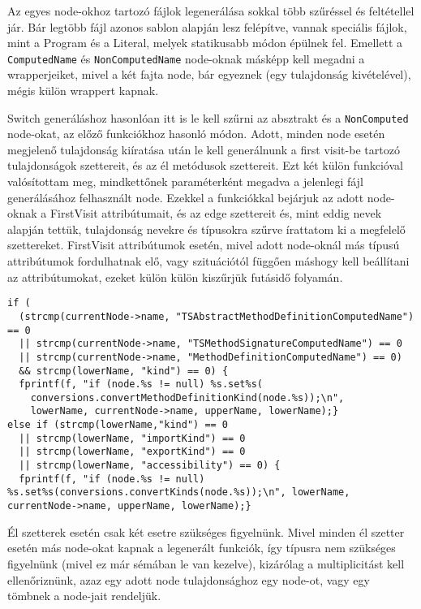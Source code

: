 Az egyes node-okhoz tartozó fájlok legenerálása sokkal több szűréssel és feltétellel jár. Bár legtöbb fájl azonos sablon alapján lesz felépítve, vannak speciális fájlok, mint a Program és a Literal, melyek statikusabb módon épülnek fel. Emellett a \texttt{ComputedName} és \texttt{NonComputedName} node-oknak másképp kell megadni a wrapperjeiket, mivel a két fajta node, bár egyeznek (egy tulajdonság kivételével), mégis külön wrappert kapnak.

Switch generáláshoz hasonlóan itt is le kell szűrni az absztrakt és a \texttt{NonComputed} node-okat, az előző funkciókhoz hasonló módon.
Adott, minden node esetén megjelenő tulajdonság kiíratása után le kell generálnunk a first visit-be tartozó tulajdonságok szettereit, és az él metódusok szettereit. Ezt két külön funkcióval valósítottam meg, mindkettőnek paraméterként megadva a jelenlegi fájl generálásához felhasznált node. 
Ezekkel a funkciókkal bejárjuk az adott node-oknak a FirstVisit attribútumait, és az edge szettereit és, mint eddig nevek alapján tettük, tulajdonság nevekre és típusokra szűrve írattatom ki a megfelelő szettereket.
FirstVisit attribútumok esetén, mivel adott node-oknál más típusú attribútumok fordulhatnak elő, vagy szituációtól függően máshogy kell beállítani az attribútumokat, ezeket külön külön kiszűrjük futásidő folyamán.

\begin{lstlisting}[caption={Attribútum szűrésről példa},label={lst:attributefilter}, style={CStyle},basicstyle=\fontsize{9}{11}\selectfont\ttfamily]
if (
  (strcmp(currentNode->name, "TSAbstractMethodDefinitionComputedName") == 0 
  || strcmp(currentNode->name, "TSMethodSignatureComputedName") == 0 
  || strcmp(currentNode->name, "MethodDefinitionComputedName") == 0) 
  && strcmp(lowerName, "kind") == 0) {
  fprintf(f, "if (node.%s != null) %s.set%s(
    conversions.convertMethodDefinitionKind(node.%s));\n", 
    lowerName, currentNode->name, upperName, lowerName);}
else if (strcmp(lowerName,"kind") == 0 
  || strcmp(lowerName, "importKind") == 0 
  || strcmp(lowerName, "exportKind") == 0 
  || strcmp(lowerName, "accessibility") == 0) {
  fprintf(f, "if (node.%s != null) %s.set%s(conversions.convertKinds(node.%s));\n", lowerName, currentNode->name, upperName, lowerName);}
\end{lstlisting}

Él szetterek esetén csak két esetre szükséges figyelnünk. Mivel minden él szetter esetén más node-okat kapnak a legenerált funkciók, így típusra nem szükséges figyelnünk (mivel ez már sémában le van kezelve), kizárólag a multiplicitást kell ellenőriznünk, azaz egy adott node tulajdonsághoz egy node-ot, vagy egy tömbnek a node-jait rendeljük.

